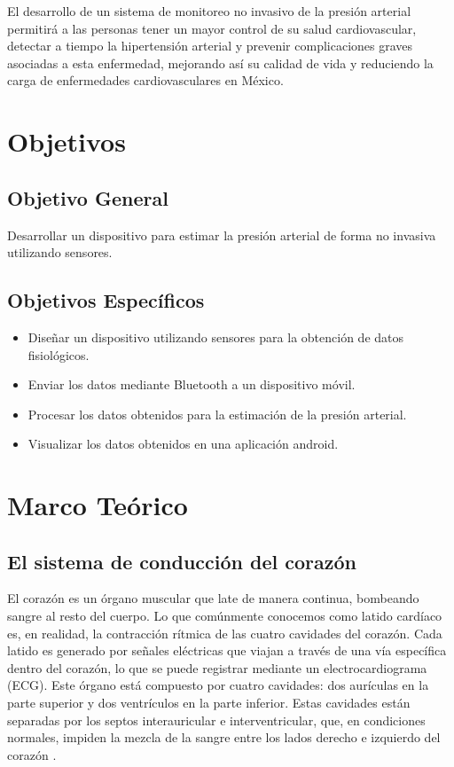 El desarrollo de un sistema de monitoreo no invasivo de la presión arterial permitirá a las personas tener un mayor control de su salud cardiovascular, detectar a tiempo la hipertensión arterial y prevenir complicaciones graves asociadas a esta enfermedad, mejorando así su calidad de vida y reduciendo la carga de enfermedades cardiovasculares en México.


\newpage
\section{Objetivos}
    \subsection{Objetivo General}
    Desarrollar un dispositivo para estimar la presión arterial de forma no invasiva utilizando sensores.
    \subsection{Objetivos Específicos}
    \begin{itemize}
        \item Diseñar un dispositivo utilizando sensores para la obtención de datos fisiológicos.
        \item Enviar los datos mediante Bluetooth a un dispositivo móvil.
        \item Procesar los datos obtenidos para la estimación de la presión arterial.
        \item Visualizar los datos obtenidos en una aplicación android.
    \end{itemize}

\newpage
\section{Marco Teórico}

    \subsection{El sistema de conducción del corazón}

    El corazón es un órgano muscular que late de manera continua, bombeando sangre al resto del cuerpo. Lo que comúnmente conocemos como latido cardíaco es, en realidad, la contracción rítmica de las cuatro cavidades del corazón. Cada latido es generado por señales eléctricas que viajan a través de una vía específica dentro del corazón, lo que se puede registrar mediante un electrocardiograma (ECG). Este órgano está compuesto por cuatro cavidades: dos aurículas en la parte superior y dos ventrículos en la parte inferior. Estas cavidades están separadas por los septos interauricular e interventricular, que, en condiciones normales, impiden la mezcla de la sangre entre los lados derecho e izquierdo del corazón \cite{tresguerres_2005}.

